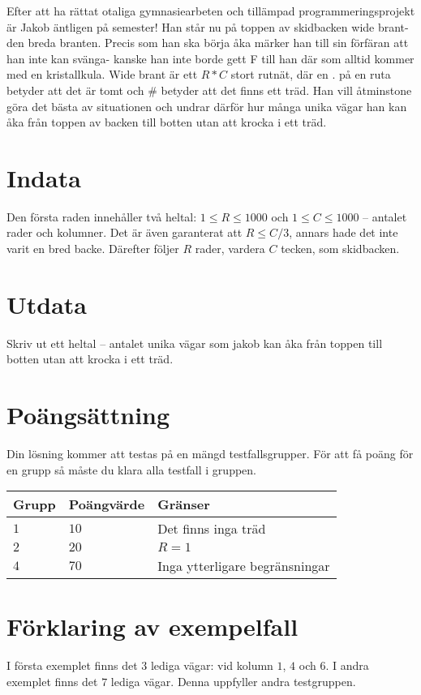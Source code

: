 Efter att ha rättat otaliga gymnasiearbeten och tillämpad programmeringsprojekt är Jakob äntligen på semester! Han står nu på toppen av skidbacken wide brant- den breda branten.
Precis som han ska börja åka märker han till sin förfäran att han inte kan svänga- kanske han inte borde gett F till han där som alltid kommer med en kristallkula.
Wide brant är ett $R*C$ stort rutnät, där en . på en ruta betyder att det är tomt och \# betyder att det finns ett träd. 
Han vill åtminstone göra det bästa av situationen och undrar därför hur många unika vägar han kan åka från toppen av backen till botten utan att krocka i ett träd.

\section*{Indata}
Den första raden innehåller två heltal: $1\leq R \leq 1000$ och $1 \leq C \leq 1000$ -- antalet rader och kolumner. Det är även garanterat att $R \leq C/3$, annars hade det inte varit en bred backe.
Därefter följer $R$ rader, vardera $C$ tecken, som skidbacken. 

\section*{Utdata}
Skriv ut ett heltal -- antalet unika vägar som jakob kan åka från toppen till botten utan att krocka i ett träd.

\section*{Poängsättning}
Din lösning kommer att testas på en mängd testfallsgrupper.
För att få poäng för en grupp så måste du klara alla testfall i gruppen.

\noindent
\begin{tabular}{| l | l | p{12cm} |}
  \hline
  Grupp & Poängvärde & Gränser \\ \hline
  $1$   & $10$       & Det finns inga träd \\ \hline
  $2$   & $20$       & $R=1$ \\ \hline
  $4$   & $70$       & Inga ytterligare begränsningar  \\ \hline
\end{tabular}

\section*{Förklaring av exempelfall}
I första exemplet finns det $3$ lediga vägar: vid kolumn $1$, $4$ och $6$.
I andra exemplet finns det $7$ lediga vägar. Denna uppfyller andra testgruppen.
